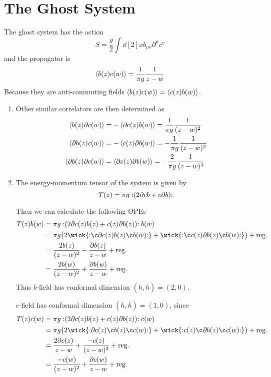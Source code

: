 \section{The Ghost System}
The ghost system has the action
\begin{equation}
	S = \frac{g}{2} \int \dd[2]{x} b_{\mu\nu} \partial^\mu c^\nu
\end{equation}
and the propagator is
\begin{equation}
	\expval{b(z) c(w)} =  \frac{1}{\pi g} \frac{1}{z-w}
\end{equation}
Because they are anti-commuting fields $\expval{b(z) c(w)} = \expval{c(z) b(w)}$.
\begin{enumerate}[label=(\alph*)]
	\item Other similar correlators are then determined as
		\begin{align}
			\expval{b(z) \partial c(w)} &= -\expval{\partial c (z)  b(w)} = \frac{1}{\pi g} \frac{1}{(z-w)^2} \\
			\expval{\partial b(z) c(w)} &= -\expval{c (z) \partial b(w)} = -\frac{1}{\pi g} \frac{1}{(z-w)^2} \\
			\expval{\partial b(z) \partial c(w)} &= \expval{\partial c (z) \partial b(w)} =- \frac{2}{ \pi g} \frac{1}{(z-w)^3}
		\end{align}

	\item The energy-momentum tensor of the system is given by
		\begin{equation}
			T(z) = \pi g :\mathrel{(2\partial c b + c \partial b)}:
		\end{equation}

		Then we can calculate the following OPEs 
		\begin{align*}
			T(z) b(w) &= \pi g \normord{(2\partial c(z) b(z) + c(z) \partial b(z))} b(w) \\
						 &= \pi g \big( 2\wick{ \normord{ \c \partial c(z) b(z) \c b(w)}} + \wick{ \normord{\c c(z) \partial b(z) \c b(w)}} \big) + \text{reg.} \\
						 &= \frac{2b(z)}{(z-w)^2} - \frac{\partial b(z)}{z-w} + \text{reg.} \\
						 &= \frac{2b(w)}{(z-w)^2} + \frac{\partial b(w)}{z-w} + \text{reg.}
		\end{align*}
		Thus $b$-field has conformal dimension $(h,\bar{h}) = (2,0)$. 

		$c$-field has conformal dimension $(h,\bar{h})=(1,0)$, since 
		\begin{align*}
			T(z) c(w) &= \pi g \normord{(2\partial c(z) b(z) + c(z) \partial b(z))} c(w) \\
						 &= \pi g \big( 2\wick{ \normord{ \partial c(z) \c b(z) \c c(w)}} + \wick{ \normord{c(z) \c \partial b(z) \c c(w)}} \big) + \text{reg.} \\
						 &= \frac{2 \partial c(z)}{z-w} + \frac{- c(z)}{(z-w)^2} + \text{reg.} \\
						 &= \frac{- c(w)}{(z-w)^2}+ \frac{ \partial c(w)}{z-w} + \text{reg.}
		\end{align*}


\end{enumerate}

